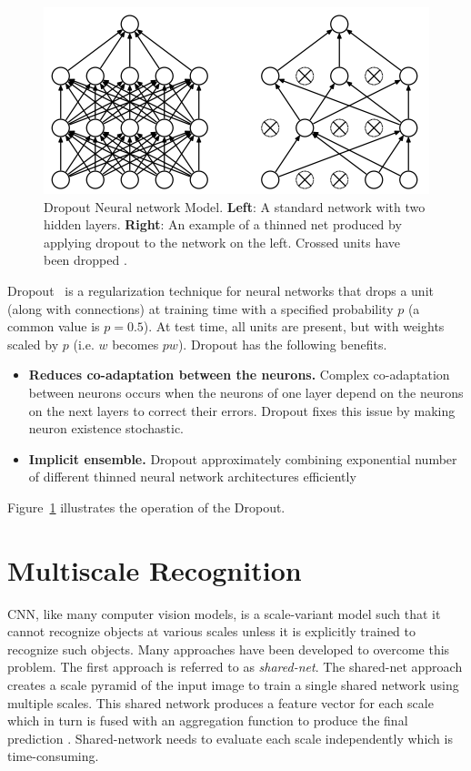 \begin{figure}
    \begin{center}
        \includegraphics[width=\textwidth]{Figures/oriDropout.png}
        \caption{\label{fig:Dropout} Dropout Neural network Model. \textbf{Left}: A standard network with two hidden layers. \textbf{Right}: An example of a thinned net produced by applying dropout to the network on the left. Crossed units have been dropped \cite{srivastava2014dropout}.}
    \end{center}
\end{figure}
Dropout~\cite{srivastava2014dropout} is a regularization technique for neural networks that drops a unit (along with connections) at training time with a specified probability $p$ (a common value is $p=0.5$). At test time, all units are present, but with weights scaled by $p$ (i.e. $w$ becomes $pw$).
Dropout has the following benefits. 
\begin{itemize}
    \item \textbf{Reduces co-adaptation between the neurons.} Complex co-adaptation between neurons occurs when the neurons of one layer depend on the neurons on the next layers to correct their errors. Dropout fixes this issue by making neuron existence stochastic.
    \item \textbf{Implicit ensemble.} Dropout  approximately combining exponential number of different thinned neural network architectures efficiently
\end{itemize}
Figure~\ref{fig:Dropout} illustrates the operation of the Dropout.

\section{Multiscale Recognition}
CNN,  like many computer vision models, is a scale-variant \cite{van2017learning} model such that it cannot recognize objects at various scales unless it is explicitly trained to recognize such objects. Many approaches have been developed to overcome this problem. The first approach is referred to as \textit{shared-net}. The shared-net approach creates a scale pyramid of the input image to train a single shared network using multiple scales. This shared network produces a feature vector for each scale which in turn is fused with an aggregation function to produce the final prediction \cite{farabet2012learning}\cite{lin2016efficient}\cite{felzenszwalb2009object}\cite{ciregan2012multi}. Shared-network needs to evaluate each scale independently which is time-consuming.

